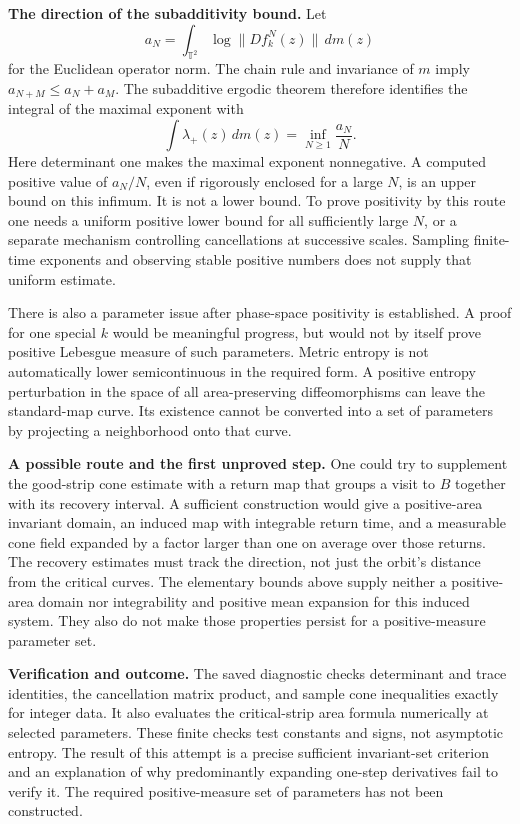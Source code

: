 \documentclass[11pt]{article}
\begin{document}
\textbf{The direction of the subadditivity bound.}
Let
\[
 a_N=\int_{\mathbb T^2}\log\|Df_k^N(z)\|\,dm(z)
\]
for the Euclidean operator norm.  The chain rule and invariance of $m$ imply
$a_{N+M}\leq a_N+a_M$.  The subadditive ergodic theorem therefore identifies
the integral of the maximal exponent with
\[
 \int\lambda_+(z)\,dm(z)=\inf_{N\geq1}\frac{a_N}{N}.
\]
Here determinant one makes the maximal exponent nonnegative.  A computed
positive value of $a_N/N$, even if rigorously enclosed for a large $N$, is
an upper bound on this infimum.  It is not a lower bound.  To prove positivity
by this route one needs a uniform positive lower bound for all sufficiently
large $N$, or a separate mechanism controlling cancellations at successive
scales.  Sampling finite-time exponents and observing stable positive numbers
does not supply that uniform estimate.

There is also a parameter issue after phase-space positivity is established.
A proof for one special $k$ would be meaningful progress, but would not by
itself prove positive Lebesgue measure of such parameters.  Metric entropy is
not automatically lower semicontinuous in the required form.  A positive
entropy perturbation in the space of all area-preserving diffeomorphisms can
leave the standard-map curve.  Its existence cannot be converted into a set
of parameters by projecting a neighborhood onto that curve.

\textbf{A possible route and the first unproved step.}
One could try to supplement the good-strip cone estimate with a return map
that groups a visit to $B$ together with its recovery interval.  A sufficient
construction would give a positive-area invariant domain, an induced map
with integrable return time, and a measurable cone field expanded by a factor
larger than one on average over those returns.  The recovery estimates must
track the direction, not just the orbit's distance from the critical curves.
The elementary bounds above supply neither a positive-area domain nor
integrability and positive mean expansion for this induced system.  They also
do not make those properties persist for a positive-measure parameter set.

\textbf{Verification and outcome.}
The saved diagnostic checks determinant and trace identities, the cancellation
matrix product, and sample cone inequalities exactly for integer data.  It
also evaluates the critical-strip area formula numerically at selected
parameters.  These finite checks test constants and signs, not asymptotic
entropy.  The result of this attempt is a precise sufficient invariant-set
criterion and an explanation of why predominantly expanding one-step
derivatives fail to verify it.  The required positive-measure set of parameters
has not been constructed.
\end{document}
